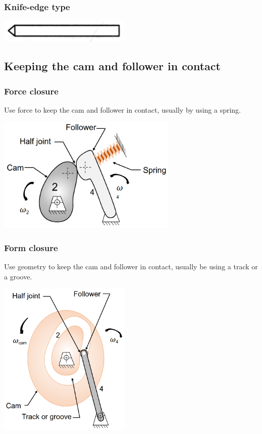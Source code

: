\documentclass[11pt]{article}
\begin{document}
\subsubsection{Knife-edge type}
\label{sec:org69ee073}
\begin{center}
\includegraphics[width=.9\linewidth]{./images/knife-edged-follower.png}
\end{center}
\subsection{Keeping the cam and follower in contact}
\label{sec:org7ebf0dc}

\subsubsection{Force closure}
\label{sec:orga2b00fc}
Use force to keep the cam and follower in contact, usually by using a spring.
\begin{center}
\includegraphics[height=15em]{./images/force-closure-diagram.png}
\end{center}
\subsubsection{Form closure}
\label{sec:org4172283}
Use geometry to keep the cam and follower in contact, usually be using a track or a groove.
\begin{center}
\includegraphics[height=20em]{./images/form-closure-diagram.png}
\end{center}
\end{document}
